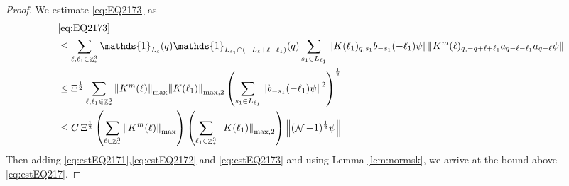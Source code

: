 \documentclass[sn-mathphys, Numbered ,a4paper]{sn-jnl}%
\DeclareMathOperator{\Z}{\mathbb{Z}}
\DeclareMathOperator{\NN}{\mathcal{N}}
\newcommand{\half}{\frac{1}{2}}
\theoremstyle{plain}
\theoremstyle{definition}
\theoremstyle{remark}
\theoremstyle{plain}
\theoremstyle{definition}
\theoremstyle{remark}
\begin{document}
\begin{proof}
We estimate \eqref{eq:EQ2173} as
\begin{align}
	&\eqref{eq:EQ2173}\nonumber\\
	&\leq\sum\limits_{\ell, \ell_1\in \Z^3_*} \mathds{1}_{L_{\ell}}(q) \mathds{1}_{L_{\ell_1}\cap (-L_{\ell}+\ell+\ell_1)}(q) \sum\limits_{s_1\in L_{\ell_1}} \norm{ K(\ell_1)_{q,s_1} b_{-s_1}(-\ell_1) \psi}\norm{ K^m(\ell)_{q,-q+\ell+\ell_1} a_{q-\ell-\ell_1} a_{q-\ell} \psi }\nonumber\\
	&\leq \Xi^\half \sum\limits_{\ell, \ell_1\in \Z^3_*} \norm{K^m(\ell)}_{\mathrm{max}} \norm{K(\ell_1)}_{\mathrm{max,2}} \left(\sum\limits_{s_1 \in L_{\ell_1}} \norm{ b_{-s_1}(-\ell_1) \psi}^2\right)^\half  \nonumber\\ 
	&\leq C\, \Xi^\half \left(\sum\limits_{\ell \in \Z^3_*} \norm{K^m(\ell)}_{\mathrm{max}}\right)\left( \sum\limits_{\ell_1\in \Z^3_*} \norm{ K(\ell_1)}_{\mathrm{max,2}} \right) \norm{(\NN+1)^\half\psi}\label{eq:estEQ2173}
\end{align}
Then adding \eqref{eq:estEQ2171},\eqref{eq:estEQ2172} and \eqref{eq:estEQ2173} and using Lemma \ref{lem:normsk}, we arrive at the bound above \eqref{eq:estEQ217}. 
\end{proof}
\end{document}
